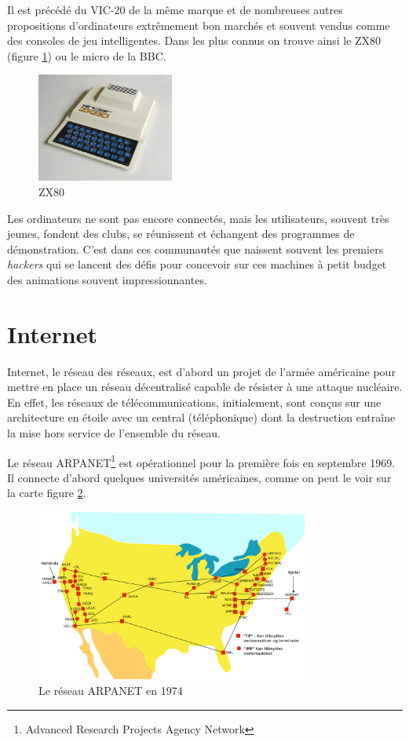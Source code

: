 \documentclass[a4paper,11pt]{book}
\begin{document}
Il est précédé du VIC-20 de la même marque et de nombreuses autres propositions d'ordinateurs extrêmement bon marchés et souvent vendus comme des consoles de jeu \guillemotleft intelligentes\guillemotright. Dans les plus connus on trouve ainsi le ZX80 (figure \ref{zx80}) ou le micro de la BBC.

\begin{figure}[h]
    \centering
    \includegraphics[width=0.4\textwidth]{media/machines/520px-ZX80.jpeg}
    \caption{ZX80}
    \label{zx80}
\end{figure}

Les ordinateurs ne sont pas encore connectés, mais les utilisateurs, souvent très jeunes, fondent des clubs, se réunissent et échangent des programmes de démonstration. C'est dans ces communautés que naissent souvent les premiers \textit{hackers} qui se lancent des défis pour concevoir sur ces machines à petit budget des animations souvent impressionnantes.

\section{Internet}

Internet, le réseau des réseaux, est d'abord un projet de l'armée américaine pour mettre en place un réseau décentralisé capable de résister à une attaque nucléaire. En effet, les réseaux de télécommunications, initialement, sont conçus sur une architecture en étoile avec un central (téléphonique) dont la destruction entraîne la mise hors service de l'ensemble du réseau. 

Le réseau ARPANET\footnote{Advanced Research Projects Agency Network} est opérationnel pour la première fois en septembre 1969. Il connecte d'abord quelques universités américaines, comme on peut le voir sur la carte figure \ref{arpanet}.

\begin{figure}[h]
    \centering
    \includegraphics[width=0.8\textwidth]{media/Arpanet_1974.svg.png}
    \caption{Le réseau ARPANET en 1974}
    \label{arpanet}
\end{figure}
\end{document}
